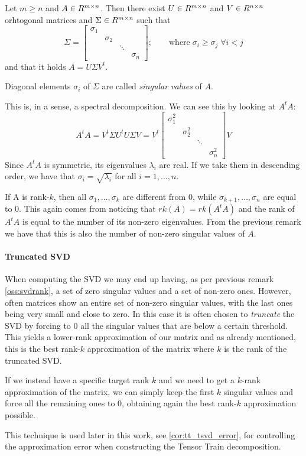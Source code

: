 \begin{Teo} \label{teo:svd}
  Let $m \geq n$ and $A \in R^{m \times n}$. Then there exist $U \in R^{m \times n}$ and $V \in R^{n \times n}$ orhtogonal matrices and $\Sigma \in R^{m \times n}$ such that
  \[
  \Sigma =
  \begin{bmatrix}
    \sigma_1 &&&\\
    & \sigma_2 &&\\
    && \ddots &\\
    &&& \sigma_n
  \end{bmatrix}
  ; \qquad \text{where} \; \sigma_i \geq \sigma_j \; \forall i < j
  \]
  and that it holds $A = U \Sigma V^t$.
\end{Teo}
Diagonal elements $\sigma_i$ of $\Sigma$ are called \emph{singular values} of $A$.
\begin{Oss}
  This is, in a sense, a spectral decomposition. We can see this by looking at $A^t A$:
  \[
  A^t A = V^t \Sigma U^t U \Sigma V = V^t
  \begin{bmatrix}
    \sigma_1^2 &&&\\
    & \sigma_2^2 &&\\
    && \ddots &\\
    &&& \sigma_n^2
  \end{bmatrix}
  V
  \]
  Since $A^t A$ is symmetric, its eigenvalues $\lambda_i$ are real. If we take them in descending order, we have that $\sigma_i = \sqrt{\lambda_i}$ for all $i = 1, \ldots, n$.
\end{Oss}
\begin{Oss} \label{oss:svdrank}
  If A is rank-$k$, then all $\sigma_1, \ldots, \sigma_k$ are different from $0$, while $\sigma_{k+1}, \ldots, \sigma_n$ are equal to $0$. This again comes from noticing that $rk(A) = rk(A^t A)$ and the rank of $A^t A$ is equal to the number of its non-zero eigenvalues. From the previous remark we have that this is also the number of non-zero singular values of $A$.
\end{Oss}

\paragraph{Truncated SVD}
When computing the SVD we may end up having, as per previous remark \eqref{oss:svdrank}, a set of zero singular values and a set of non-zero ones. However, often matrices show an entire set of non-zero singular values, with the last ones being very small and close to zero.
In this case it is often chosen to \emph{truncate} the SVD by forcing to $0$ all the singular values that are below a certain threshold. This yields a lower-rank approximation of our matrix and as already mentioned, this is the best rank-$k$ approximation of the matrix where $k$ is the rank of the truncated SVD.

If we instead have a specific target rank $k$ and we need to get a $k$-rank approximation of the matrix, we can simply keep the first $k$ singular values and force all the remaining ones to $0$, obtaining again the best rank-$k$ approximation possible.

This technique is used later in this work, see \eqref{cor:tt_tsvd_error}, for controlling the approximation error when constructing the Tensor Train decomposition.
